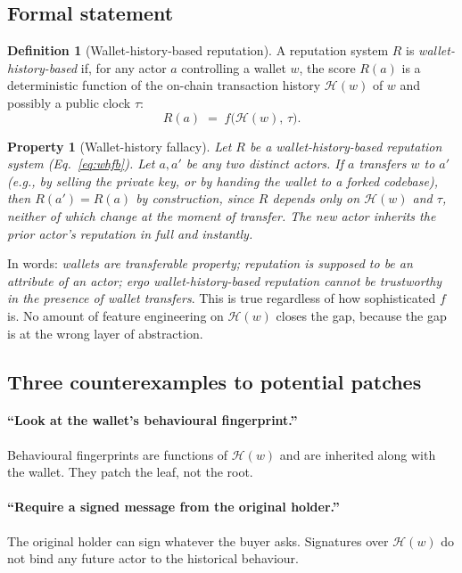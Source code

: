 \documentclass[10pt,conference,letterpaper]{IEEEtran}
\newtheorem{property}[theorem]{Property}
\theoremstyle{definition}
\newtheorem{definition}[theorem]{Definition}
\begin{document}
\subsection{Formal statement}

\begin{definition}[Wallet-history-based reputation]\label{def:whfb}
A reputation system $R$ is \emph{wallet-history-based} if, for any actor
$a$ controlling a wallet $w$, the score $R(a)$ is a deterministic
function of the on-chain transaction history $\mathcal{H}(w)$ of $w$ and
possibly a public clock $\tau$:
\begin{equation}
R(a) \;=\; f\bigl(\mathcal{H}(w),\,\tau\bigr).
\label{eq:whfb}
\end{equation}
\end{definition}

\begin{property}[Wallet-history fallacy]\label{prop:whf}
Let $R$ be a wallet-history-based reputation system (Eq.~\ref{eq:whfb}).
Let $a, a'$ be any two distinct actors. If $a$ transfers $w$ to $a'$
(e.g., by selling the private key, or by handing the wallet to a forked
codebase), then $R(a') = R(a)$ by construction, since $R$ depends only
on $\mathcal{H}(w)$ and $\tau$, neither of which change at the moment of
transfer. The new actor inherits the prior actor's reputation in full
and instantly.
\end{property}

\noindent
In words: \emph{wallets are transferable property; reputation is
supposed to be an attribute of an actor; ergo wallet-history-based
reputation cannot be trustworthy in the presence of wallet transfers}.
This is true regardless of how sophisticated $f$ is. No amount of
feature engineering on $\mathcal{H}(w)$ closes the gap, because the gap
is at the wrong layer of abstraction.

\subsection{Three counterexamples to potential patches}

\paragraph{``Look at the wallet's behavioural fingerprint.''}
Behavioural fingerprints are functions of $\mathcal{H}(w)$ and are
inherited along with the wallet. They patch the leaf, not the root.

\paragraph{``Require a signed message from the original holder.''}
The original holder can sign whatever the buyer asks. Signatures over
$\mathcal{H}(w)$ do not bind any future actor to the historical
behaviour.
\end{document}
